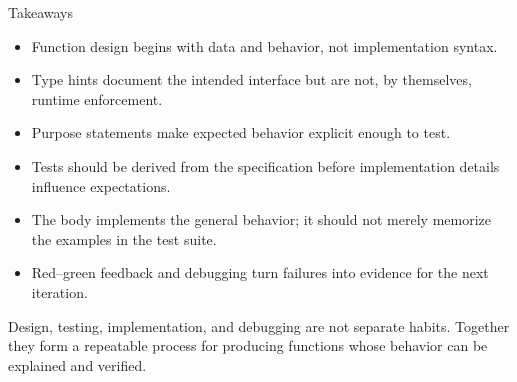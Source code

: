\documentclass[aspectratio=169,10pt]{beamer}
\begin{document}
\begin{frame}{Takeaways}
  \begin{itemize}
    \item Function design begins with data and behavior, not implementation syntax.
    \item Type hints document the intended interface but are not, by themselves, runtime enforcement.
    \item Purpose statements make expected behavior explicit enough to test.
    \item Tests should be derived from the specification before implementation details influence expectations.
    \item The body implements the general behavior; it should not merely memorize the examples in the test suite.
    \item Red--green feedback and debugging turn failures into evidence for the next iteration.
  \end{itemize}

  \begin{keyidea}
    Design, testing, implementation, and debugging are not separate habits. Together they form a repeatable process for producing functions whose behavior can be explained and verified.
  \end{keyidea}
\end{frame}
\end{document}
